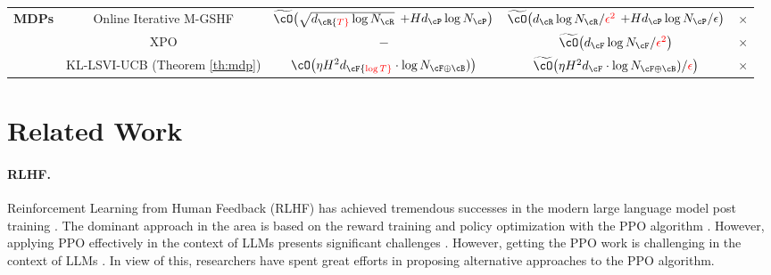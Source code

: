 \documentclass[11pt]{article}
\begin{document}
\begin{table*}[ht]
{\begin{tabular}{c c c c c}
    \multirow{3}{*}{\textbf{MDPs}}
     & \makecell{Online Iterative M-GSHF\footnotemark[2] \\ \citep{xiong2024building}} & \makecell{$\widetilde{\cO}\big(\sqrt{d_\cR {\color{red} T}\log N_\cR}$ \\$+Hd_\cP\log N_\cP\big)$} & \makecell{$\widetilde{\cO}\big(d_\cR \log N_\cR/{\color{red}\epsilon^2}$\\ $+ Hd_\cP\log N_\cP/\epsilon \big)$} & $\times$ \\
     & XPO \citep{xie2024exploratory}\footnotemark[3] & $-$ & $\widetilde{\cO}\big(d_\cF\log N_{\cF}/{\color{red} \epsilon^2}\big)$ & $\times$ \\
     \rowcolor{blue!15} 
     & KL-LSVI-UCB (Theorem \ref{th:mdp}) & $\cO\big(\eta H^2 d_\cF {\color{red} \log T} \cdot\log N_{\cF\oplus\cB})\big)$ & $\widetilde{\cO}\big(\eta H^2 d_\cF  \cdot\log N_{\cF\oplus\cB}) / {\color{red} \epsilon}\big)$ & $\times$ \\
    \bottomrule
    \end{tabular}}
    \end{table*}

\section{Related Work}

\paragraph{RLHF.} Reinforcement Learning from Human Feedback (RLHF) has achieved tremendous successes in the modern large language model post training \citep{OpenAI2023GPT4TR, bai2022training, ouyang2022training, team2023gemini}. The dominant approach in the area is based on the reward training and policy optimization with the PPO algorithm \citep{schulman2017proximal}. However, applying PPO effectively in the context of LLMs presents significant challenges \citep{choshen2019weaknesses}. However, getting the PPO work is challenging in the context of LLMs \citep{choshen2019weaknesses}. In view of this, researchers have spent great efforts in proposing alternative approaches to the PPO algorithm. 
\end{document}
